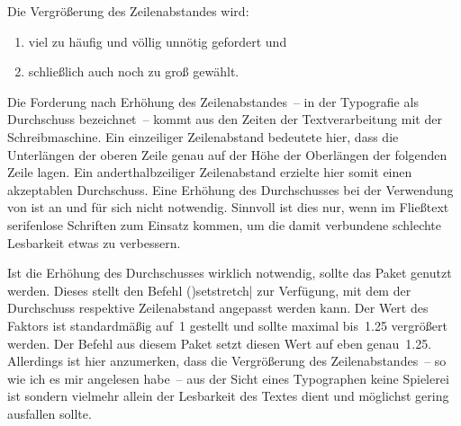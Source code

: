 \begin{DeclarePackages}[Typografie]
  Die Vergrößerung des Zeilenabstandes wird:
  \begin{enumerate}[itemindent=0pt,labelwidth=*,labelsep=1em,label=\Roman*.]
  \item viel zu häufig und völlig unnötig gefordert und
  \item schließlich auch noch zu groß gewählt.
  \end{enumerate}
  
  Die Forderung nach Erhöhung des Zeilenabstandes~-- in der Typografie als 
  Durchschuss bezeichnet~-- kommt aus den Zeiten der Textverarbeitung mit der 
  Schreibmaschine. Ein einzeiliger Zeilenabstand bedeutete hier, dass die 
  Unterlängen der oberen Zeile genau auf der Höhe der Oberlängen der folgenden 
  Zeile lagen. Ein anderthalbzeiliger Zeilenabstand erzielte hier somit einen 
  akzeptablen Durchschuss. Eine Erhöhung des Durchschusses bei der Verwendung 
  von  ist an und für sich nicht notwendig. Sinnvoll ist dies 
  nur, wenn im Fließtext serifenlose Schriften zum Einsatz kommen, um die damit 
  verbundene schlechte Lesbarkeit etwas zu verbessern.
  
  Ist die Erhöhung des Durchschusses wirklich notwendig, sollte das Paket 
   genutzt werden. Dieses stellt den Befehl 
  \Macro(){setstretch|} zur Verfügung, 
  mit dem der Durchschuss respektive Zeilenabstand angepasst werden kann. Der 
  Wert des Faktors ist standardmäßig auf~1 gestellt und sollte maximal bis~1.25 
  vergrößert werden. Der Befehl  aus diesem Paket setzt 
  diesen Wert auf eben genau~1.25. Allerdings ist hier anzumerken, dass die 
  Vergrößerung des Zeilenabstandes~-- so wie ich es mir angelesen habe~-- aus 
  der Sicht eines Typographen keine Spielerei ist sondern vielmehr allein der 
  Lesbarkeit des Textes dient und möglichst gering ausfallen sollte.
  

\end{DeclarePackages}
